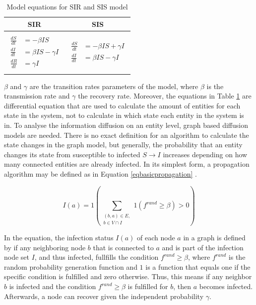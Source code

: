 \begin{table}[ht!]
    \centering
    \begin{tabular}{|c | c |} 
     \hline
     SIR & SIS  \\ 
     \hline
     & \\
     $\begin{aligned}
          \frac{dS}{dt} &= -\beta I S \\
          \frac{dI}{dt} &= \beta I S - \gamma I \\
          \frac{dR}{dt} &= \gamma I  
        \end{aligned}$
      &
      $\begin{aligned}
          \frac{dS}{dt} &= -\beta I S + \gamma I\\
          \frac{dI}{dt} &= \beta I S - \gamma I
        \end{aligned}$
       \\ 
       & \\
     \hline
    \end{tabular}
    \caption{Model equations for SIR and SIS model \cite{sirequation}}
    \label{SI-table-equations}
\end{table}

$\beta$ and $\gamma$ are the transition rates parameters of the model, where 
$\beta$ is the transmission rate and $\gamma$ the 
recovery rate. Moreover, the equations in Table \ref{SI-table-equations}
are differential equation that are used to calculate the amount
of entities for each state in the system, not to calculate in which state
each entity in the system is in. To analyse the information diffusion on 
an entity level, graph based diffusion models are needed.
There is no exact definition for an algorithm to calculate the state changes in the
graph model, but generally, the probability that an entity changes
its state from susceptible to infected $S \to I$ increases depending on
how many connected entities are already infected. In its simplest form, a
propagation algorithm may be defined as in Equation \ref{eqbasicpropagation} 
\cite{easypropagation}.

\begin{equation}
    I(a) = 1 (\sum\limits_{\substack{(b,a)\in E, \\ b \in V \cap I}}
    1(f^{rand}\geq \beta)>0) 
    \label{eqbasicpropagation}
\end{equation}

In the equation, the infection status $I(a)$ of each node $a$
in a graph is defined by if any neighboring node $b$ that is connected 
to $a$ and is part of the infection node set $I$, 
and thus infected, fullfills the condition $f^{rand}\geq \beta$,
where $f^{rand}$ is the random probability generation function and $1$ 
is a function that equals one if the specific condition is fulfilled and 
zero otherwise. Thus, this means if any neighbor $b$ is infected and the 
condition $f^{rand}\geq \beta$ is fulfilled for $b$, then $a$ becomes infected. 
Afterwards, a node can recover given the independent probability
$\gamma$.

